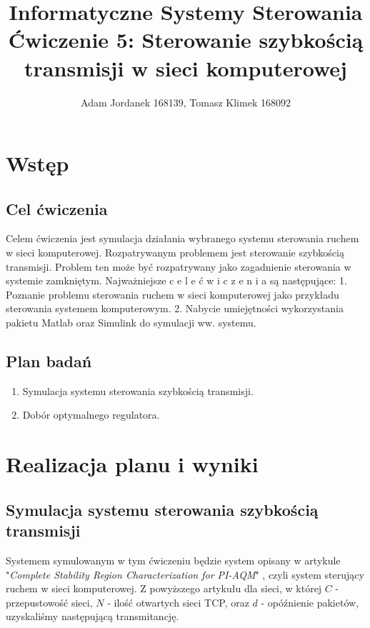 \documentclass[a4paper,10pt]{article}
\title{Informatyczne Systemy Sterowania \\ \large Ćwiczenie 5: Sterowanie szybkością transmisji w sieci komputerowej}
\author{Adam Jordanek 168139, Tomasz Klimek 168092}
\begin{document}
\maketitle
\section{Wstęp}\label{sec:wstęp}
\subsection{Cel ćwiczenia}
Celem ćwiczenia jest symulacja działania wybranego systemu sterowania ruchem w sieci 
komputerowej. Rozpatrywanym problemem jest sterowanie szybkością transmisji. 
Problem ten może być rozpatrywany jako zagadnienie sterowania w systemie 
zamkniętym. 
Najważniejsze  c e l e   ć w i c z e n i a   są następujące: 
1. Poznanie problemu sterowania ruchem w sieci komputerowej jako przykładu 
sterowania systemem komputerowym. 
2. Nabycie umiejętności wykorzystania pakietu Matlab oraz Simulink do symulacji ww. 
systemu. 
\subsection{Plan badań} 
\begin{enumerate}
	\item Symulacja systemu sterowania szybkością transmisji.
	\item Dobór optymalnego regulatora.
\end{enumerate}
\section{Realizacja planu i wyniki}

\subsection{Symulacja systemu sterowania szybkością transmisji}

Systemem symulowanym w tym ćwiczeniu będzie system opisany w artykule "\textit{Complete Stability Region
Characterization for PI-AQM}" , czyli system sterujący ruchem w sieci komputerowej. Z powyższego artykułu dla sieci, w której $C$ - przepustowość sieci, $N$ - ilość otwartych sieci TCP, oraz $d$ - opóźnienie pakietów, uzyskaliśmy następującą transmitancję.
\end{document}
